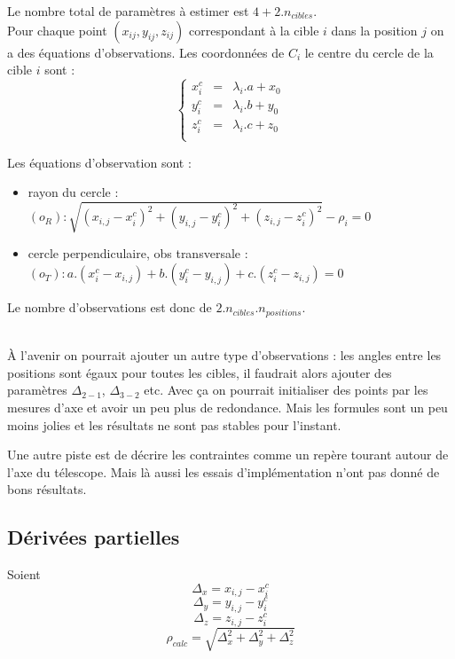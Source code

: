 \documentclass[french]{report}
\begin{document}
Le nombre total de paramètres à estimer est $4 + 2 . n_{cibles}$.
\\

Pour chaque point $(x_{ij},y_{ij},z_{ij})$ correspondant à la cible $i$ dans la position $j$ on a des équations d'observations.
Les coordonnées de $C_i$ le centre du cercle de la cible $i$ sont :
$$\left\{\begin{array}{rcr}
    x^c_i & = & \lambda_i . a + x_0 \\
    y^c_i & = & \lambda_i . b + y_0 \\
    z^c_i & = & \lambda_i . c + z_0 \\
  \end{array}\right.
 $$



Les équations d'observation sont :
\begin{itemize}
\item rayon du cercle : $(o_R) :\sqrt{(x_{i,j}-x^c_i)^2+(y_{i,j}-y^c_i)^2+(z_{i,j}-z^c_i)^2}-\rho_i = 0$
\item cercle perpendiculaire, obs transversale : $(o_T) : a.(x^c_i-x_{i,j}) + b.(y^c_i-y_{i,j}) + c.(z^c_i-z_{i,j}) = 0$
\end{itemize}

Le nombre d'observations est donc de $ 2.n_{cibles}.n_{positions} $.

\ \\

À l'avenir on pourrait ajouter un autre type d'observations : les angles entre les positions sont égaux pour toutes les cibles,
il faudrait alors ajouter des paramètres $\Delta_{2-1}$, $\Delta_{3-2}$ etc. Avec ça on pourrait initialiser des points par les mesures d'axe
et avoir un peu plus de redondance.
Mais les formules sont un peu moins jolies et les résultats ne sont pas stables pour l'instant.

Une autre piste est de décrire les contraintes comme un repère tourant autour de l'axe du télescope. Mais là aussi les essais d'implémentation n'ont pas donné de bons résultats.


\subsection{Dérivées partielles}
Soient
$$\Delta_x = x_{i,j}-x^c_i$$
$$\Delta_y = y_{i,j}-y^c_i$$
$$\Delta_z = z_{i,j}-z^c_i$$
$$\rho_{calc} = \sqrt{\Delta_x^2+\Delta_y^2+\Delta_z^2}$$
\end{document}
